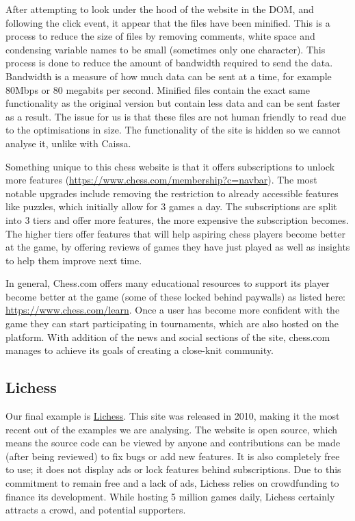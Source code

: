 After attempting to look under the hood of the website in the DOM, and following the click event, it appear that the files have been minified. This is a process to reduce the size of files by removing comments, white space and condensing variable names to be small (sometimes only one character). This process is done to reduce the amount of bandwidth required to send the data. Bandwidth is a measure of how much data can be sent at a time, for example 80Mbps or 80 megabits per second. Minified files contain the exact same functionality as the original version but contain less data and can be sent faster as a result. The issue for us is that these files are not human friendly to read due to the optimisations in size. The functionality of the site is hidden so we cannot analyse it, unlike with Caissa.

Something unique to this chess website is that it offers subscriptions to unlock more features (\url{https://www.chess.com/membership?c=navbar}). The most notable upgrades include removing the restriction to already accessible features like puzzles, which initially allow for 3 games a day. The subscriptions are split into 3 tiers and offer more features, the more expensive the subscription becomes. The higher tiers offer features that will help aspiring chess players become better at the game, by offering reviews of games they have just played as well as insights to help them improve next time.

In general, Chess.com offers many educational resources to support its player become better at the game (some of these locked behind paywalls) as listed here: \url{https://www.chess.com/learn}. Once a user has become more confident with the game they can start participating in tournaments, which are also hosted on the platform. With addition of the news and social sections of the site, chess.com manages to achieve its goals \cite{Chess.com} of creating a close-knit community.

\subsection{Lichess}

\cite{Lichess} Our final example is \href{https://lichess.org}{Lichess}. This site was released in 2010, making it the most recent out of the examples we are analysing. The website is open source, which means the source code can be viewed by anyone and contributions can be made (after being reviewed) to fix bugs or add new features. It is also completely free to use; it does not display ads or lock features behind subscriptions. Due to this commitment to remain free and a lack of ads, Lichess relies on crowdfunding to finance its development. While hosting 5 million games daily, Lichess certainly attracts a crowd, and potential supporters.

